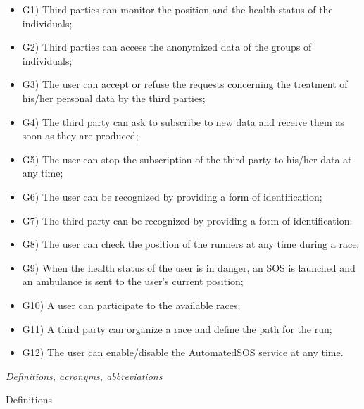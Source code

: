 \documentclass{article}
\begin{document}
\begin{legal}
\begin{legal}
\begin{legal}
{\begin{itemize}
				\item G1) Third parties can monitor the position and the health status of the individuals;\\
				\item G2) Third parties can access the anonymized data of the groups of individuals;\\
				\item G3) The user can accept or refuse the requests concerning the treatment of his/her personal data by the third parties;\\
				\item G4) The third party can ask to subscribe to new data and receive them as soon as they are produced;\\
				\item G5) The user can stop the subscription of the third party to his/her data at any time;\\
				\item G6) The user can be recognized by providing a form of identification;\\
				\item G7) The third party can be recognized by providing a form of identification;\\
				\item G8) The user can check the position of the runners at any time during a race;\\
				\item G9) When the health status of the user is in danger, an SOS is launched and an ambulance is sent to the user’s current position;\\
				\item G10) A user can participate to the available races;\\
				\item G11) A third party can organize a race and define the path for the run;\\
				\item G12) The user can enable/disable the AutomatedSOS service at any time.\\
				\end{itemize}
			}
			\end{legal}
		\item \textit{Definitions, acronyms, abbreviations}\\
			\begin{legal}
			\item Definitions\\
			{\normalfont
				\begin{itemize}

\end{itemize}}
\end{legal}
\end{legal}
\end{legal}
\end{document}
